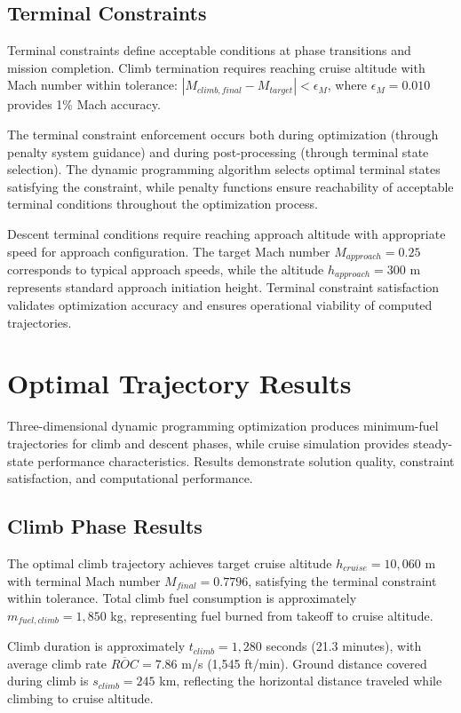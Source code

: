 \subsection{Terminal Constraints}

Terminal constraints define acceptable conditions at phase transitions and mission completion. Climb termination requires reaching cruise altitude with Mach number within tolerance: $|M_{climb,final} - M_{target}| < \epsilon_M$, where $\epsilon_M = 0.010$ provides 1\% Mach accuracy.

The terminal constraint enforcement occurs both during optimization (through penalty system guidance) and during post-processing (through terminal state selection). The dynamic programming algorithm selects optimal terminal states satisfying the constraint, while penalty functions ensure reachability of acceptable terminal conditions throughout the optimization process.

Descent terminal conditions require reaching approach altitude with appropriate speed for approach configuration. The target Mach number $M_{approach} = 0.25$ corresponds to typical approach speeds, while the altitude $h_{approach} = 300$ m represents standard approach initiation height. Terminal constraint satisfaction validates optimization accuracy and ensures operational viability of computed trajectories.

\section{Optimal Trajectory Results}

Three-dimensional dynamic programming optimization produces minimum-fuel trajectories for climb and descent phases, while cruise simulation provides steady-state performance characteristics. Results demonstrate solution quality, constraint satisfaction, and computational performance.

\subsection{Climb Phase Results}

The optimal climb trajectory achieves target cruise altitude $h_{cruise} = 10,060$ m with terminal Mach number $M_{final} = 0.7796$, satisfying the terminal constraint within tolerance. Total climb fuel consumption is approximately $m_{fuel,climb} = 1,850$ kg, representing fuel burned from takeoff to cruise altitude.

Climb duration is approximately $t_{climb} = 1,280$ seconds (21.3 minutes), with average climb rate $\overline{ROC} = 7.86$ m/s (1,545 ft/min). Ground distance covered during climb is $s_{climb} = 245$ km, reflecting the horizontal distance traveled while climbing to cruise altitude.

